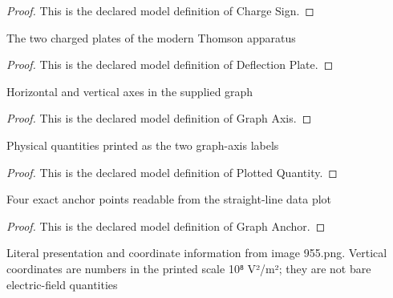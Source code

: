\begin{proof}
  This is the declared model definition of Charge Sign.
\end{proof}
\begin{definition}
  \label{def:physics:phyx-mini-0955:phyxminiproblems-problemphyxmini0955-deflectionplate}
  The two charged plates of the modern Thomson apparatus
\end{definition}
\begin{proof}
  This is the declared model definition of Deflection Plate.
\end{proof}
\begin{definition}
  \label{def:physics:phyx-mini-0955:phyxminiproblems-problemphyxmini0955-graphaxis}
  Horizontal and vertical axes in the supplied graph
\end{definition}
\begin{proof}
  This is the declared model definition of Graph Axis.
\end{proof}
\begin{definition}
  \label{def:physics:phyx-mini-0955:phyxminiproblems-problemphyxmini0955-plottedquantity}
  Physical quantities printed as the two graph-axis labels
\end{definition}
\begin{proof}
  This is the declared model definition of Plotted Quantity.
\end{proof}
\begin{definition}
  \label{def:physics:phyx-mini-0955:phyxminiproblems-problemphyxmini0955-graphanchor}
  Four exact anchor points readable from the straight-line data plot
\end{definition}
\begin{proof}
  This is the declared model definition of Graph Anchor.
\end{proof}
\begin{definition}
  \label{def:physics:phyx-mini-0955:phyxminiproblems-problemphyxmini0955-esquaredversusvoltagegraph}
  Literal presentation and coordinate information from image 955.png. Vertical coordinates are numbers in the printed scale 10⁸ V²/m²; they are not bare electric-field quantities
\end{definition}
